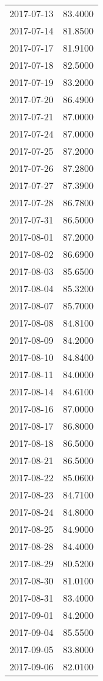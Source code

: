 \begin{tabular}{lr}
2017-07-13 &     83.4000 \\
2017-07-14 &     81.8500 \\
2017-07-17 &     81.9100 \\
2017-07-18 &     82.5000 \\
2017-07-19 &     83.2000 \\
2017-07-20 &     86.4900 \\
2017-07-21 &     87.0000 \\
2017-07-24 &     87.0000 \\
2017-07-25 &     87.2000 \\
2017-07-26 &     87.2800 \\
2017-07-27 &     87.3900 \\
2017-07-28 &     86.7800 \\
2017-07-31 &     86.5000 \\
2017-08-01 &     87.2000 \\
2017-08-02 &     86.6900 \\
2017-08-03 &     85.6500 \\
2017-08-04 &     85.3200 \\
2017-08-07 &     85.7000 \\
2017-08-08 &     84.8100 \\
2017-08-09 &     84.2000 \\
2017-08-10 &     84.8400 \\
2017-08-11 &     84.0000 \\
2017-08-14 &     84.6100 \\
2017-08-16 &     87.0000 \\
2017-08-17 &     86.8000 \\
2017-08-18 &     86.5000 \\
2017-08-21 &     86.5000 \\
2017-08-22 &     85.0600 \\
2017-08-23 &     84.7100 \\
2017-08-24 &     84.8000 \\
2017-08-25 &     84.9000 \\
2017-08-28 &     84.4000 \\
2017-08-29 &     80.5200 \\
2017-08-30 &     81.0100 \\
2017-08-31 &     83.4000 \\
2017-09-01 &     84.2000 \\
2017-09-04 &     85.5500 \\
2017-09-05 &     83.8000 \\
2017-09-06 &     82.0100 \\

\end{tabular}
